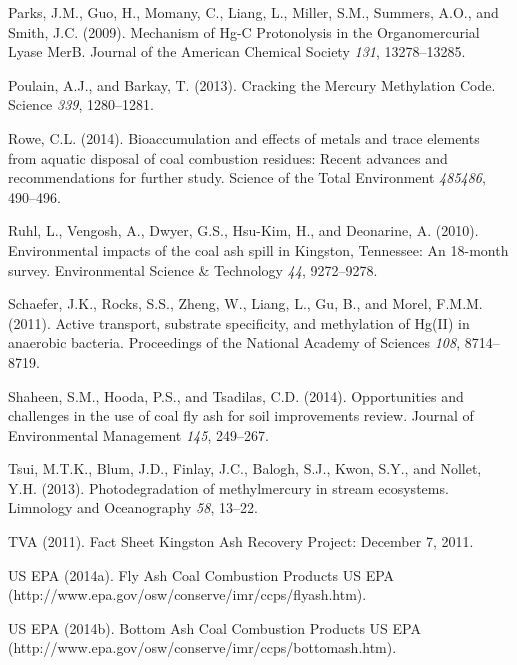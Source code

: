 \documentclass[ms]{uncgdissertationexp}
\theoremstyle{plain}
\theoremstyle{definition}
\theoremstyle{remark}
\begin{document}
  \hypertarget{ref-parksMechanismHgProtonolysis2009}{}
  Parks, J.M., Guo, H., Momany, C., Liang, L., Miller, S.M., Summers,
  A.O., and Smith, J.C. (2009). Mechanism of Hg-C Protonolysis in the
  Organomercurial Lyase MerB. Journal of the American Chemical Society
  \emph{131}, 13278--13285.
  
  \hypertarget{ref-poulainCrackingMercuryMethylation2013}{}
  Poulain, A.J., and Barkay, T. (2013). Cracking the Mercury Methylation
  Code. Science \emph{339}, 1280--1281.
  
  \hypertarget{ref-roweBioaccumulationEffectsMetals2014}{}
  Rowe, C.L. (2014). Bioaccumulation and effects of metals and trace
  elements from aquatic disposal of coal combustion residues: Recent
  advances and recommendations for further study. Science of the Total
  Environment \emph{485486}, 490--496.
  
  \hypertarget{ref-ruhlEnvironmentalImpactsCoal2010}{}
  Ruhl, L., Vengosh, A., Dwyer, G.S., Hsu-Kim, H., and Deonarine, A.
  (2010). Environmental impacts of the coal ash spill in Kingston,
  Tennessee: An 18-month survey. Environmental Science \& Technology
  \emph{44}, 9272--9278.
  
  \hypertarget{ref-schaeferActiveTransportSubstrate2011}{}
  Schaefer, J.K., Rocks, S.S., Zheng, W., Liang, L., Gu, B., and Morel,
  F.M.M. (2011). Active transport, substrate specificity, and methylation
  of Hg(II) in anaerobic bacteria. Proceedings of the National Academy of
  Sciences \emph{108}, 8714--8719.
  
  \hypertarget{ref-shaheenOpportunitiesChallengesUse2014}{}
  Shaheen, S.M., Hooda, P.S., and Tsadilas, C.D. (2014). Opportunities and
  challenges in the use of coal fly ash for soil improvements review.
  Journal of Environmental Management \emph{145}, 249--267.
  
  \hypertarget{ref-tsuiPhotodegradationMethylmercuryStream2013}{}
  Tsui, M.T.K., Blum, J.D., Finlay, J.C., Balogh, S.J., Kwon, S.Y., and
  Nollet, Y.H. (2013). Photodegradation of methylmercury in stream
  ecosystems. Limnology and Oceanography \emph{58}, 13--22.
  
  \hypertarget{ref-tvaFactSheetKingston2011}{}
  TVA (2011). Fact Sheet Kingston Ash Recovery Project: December 7, 2011.
  
  \hypertarget{ref-usepaFlyAshCoal2014}{}
  US EPA (2014a). Fly Ash \textbar{} Coal Combustion Products \textbar{}
  US EPA (http://www.epa.gov/osw/conserve/imr/ccps/flyash.htm).
  
  \hypertarget{ref-usepaBottomAshCoal2014}{}
  US EPA (2014b). Bottom Ash \textbar{} Coal Combustion Products
  \textbar{} US EPA
  (http://www.epa.gov/osw/conserve/imr/ccps/bottomash.htm).
  
\end{document}

